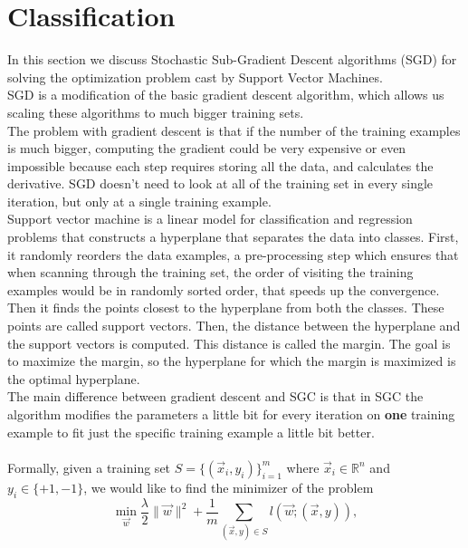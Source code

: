 \documentclass[12pt]{article}
\begin{document}
\section{Classification}
In this section we discuss Stochastic Sub-Gradient Descent algorithms (SGD) for solving the optimization problem cast by Support Vector Machines.\\
SGD is a modification of the basic gradient descent algorithm, which allows us scaling these algorithms to much bigger training sets. \\
The problem with gradient descent is that if the number of the training examples is much bigger, computing the gradient could be very expensive or even impossible because each step requires storing all the data, and calculates the derivative. 
SGD doesn't need to look at all of the training set in every single iteration, but only at a single training example. \\
Support vector machine is a linear model for classification and regression problems that constructs a hyperplane that separates the data into classes.
First, it randomly reorders the data examples, a pre-processing step which ensures that when scanning through the training set, the order of visiting the training examples would be in randomly sorted order, that speeds up the convergence.\\
Then it finds the points closest to the hyperplane from both the classes. These points are called support vectors. 
Then, the distance between the hyperplane and the support vectors is computed. This distance is called the margin.
The goal is to maximize the margin, so the hyperplane for which the margin is maximized is the optimal hyperplane.\\
The main difference between gradient descent and SGC is that in SGC the algorithm modifies the parameters a little bit for every iteration on \textbf{one} training example to fit just the specific training example a little bit better. \\
\\Formally, given a training set $S= \{(\vec{x}_i,y_i)\}_{i=1}^{m}$ where $\Vec{x}_i \in \mathbb{R}^n$ and $y_i \in \{+1, −1\}$, we would like to find the minimizer of the problem
\begin{equation}\label{P:8}
    \min_{\vec{w}} \frac{\lambda}{2}\|\vec{w}\|^2 + \frac{1}{m} \sum_{(\vec{x},y) \in S} l(\vec{w};(\vec{x},y)),
\end{equation}
\end{document}
